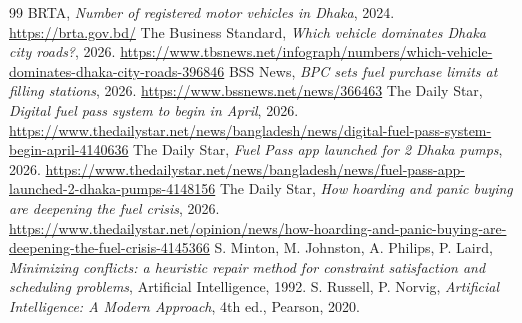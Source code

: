 \documentclass[11pt,a4paper]{article}
\begin{document}
\begin{thebibliography}{99}
 BRTA, \emph{Number of registered motor vehicles in Dhaka}, 2024. \url{https://brta.gov.bd/}
 The Business Standard, \emph{Which vehicle dominates Dhaka city roads?}, 2026. \url{https://www.tbsnews.net/infograph/numbers/which-vehicle-dominates-dhaka-city-roads-396846}
 BSS News, \emph{BPC sets fuel purchase limits at filling stations}, 2026. \url{https://www.bssnews.net/news/366463}
 The Daily Star, \emph{Digital fuel pass system to begin in April}, 2026. \url{https://www.thedailystar.net/news/bangladesh/news/digital-fuel-pass-system-begin-april-4140636}
 The Daily Star, \emph{Fuel Pass app launched for 2 Dhaka pumps}, 2026. \url{https://www.thedailystar.net/news/bangladesh/news/fuel-pass-app-launched-2-dhaka-pumps-4148156}
 The Daily Star, \emph{How hoarding and panic buying are deepening the fuel crisis}, 2026. \url{https://www.thedailystar.net/opinion/news/how-hoarding-and-panic-buying-are-deepening-the-fuel-crisis-4145366}
 S. Minton, M. Johnston, A. Philips, P. Laird,
       \emph{Minimizing conflicts: a heuristic repair method for constraint
       satisfaction and scheduling problems}, Artificial Intelligence, 1992.
 S. Russell, P. Norvig, \emph{Artificial Intelligence: A Modern Approach}, 4th ed., Pearson, 2020.
\end{thebibliography}
\end{document}
